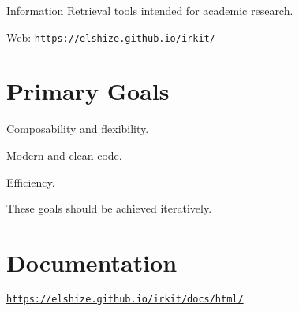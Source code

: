 Information Retrieval tools intended for academic research.

Web\+: \href{https://elshize.github.io/irkit/}{\tt https\+://elshize.\+github.\+io/irkit/}

\section*{Primary Goals}


\begin{DoxyEnumerate}
\item Composability and flexibility.
\item Modern and clean code.
\item Efficiency.
\end{DoxyEnumerate}

These goals should be achieved iteratively.

\section*{Documentation}

\href{https://elshize.github.io/irkit/docs/html/}{\tt https\+://elshize.\+github.\+io/irkit/docs/html/} 